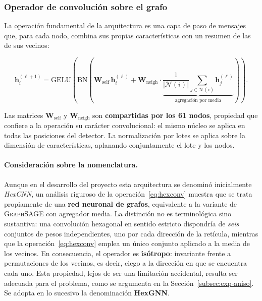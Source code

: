 \subsubsection{Operador de convolución sobre el grafo}

La operación fundamental de la arquitectura es una capa de paso de mensajes que, para cada nodo,
combina sus propias características con un resumen de las de sus vecinos:

\begin{equation}
    \mathbf{h}_i^{(\ell+1)} = \mathrm{GELU}\!\left(
        \mathrm{BN}\!\left(
            \mathbf{W}_{\text{self}}\, \mathbf{h}_i^{(\ell)}
            + \mathbf{W}_{\text{neigh}} \cdot
            \underbrace{\frac{1}{|\mathcal{N}(i)|} \sum_{j \in \mathcal{N}(i)} \mathbf{h}_j^{(\ell)}}_{\text{agregación por media}}
        \right)
    \right).
    \label{eq:hexconv}
\end{equation}

Las matrices $\mathbf{W}_{\text{self}}$ y $\mathbf{W}_{\text{neigh}}$ son \textbf{compartidas por
los 61 nodos}, propiedad que confiere a la operación su carácter convolucional: el mismo núcleo se
aplica en todas las posiciones del detector. La normalización por lotes se aplica sobre la dimensión
de características, aplanando conjuntamente el lote y los nodos.

\paragraph{Consideración sobre la nomenclatura.} Aunque en el desarrollo del proyecto esta
arquitectura se denominó inicialmente \emph{HexCNN}, un análisis riguroso de la
operación~\eqref{eq:hexconv} muestra que se trata propiamente de una \textbf{red neuronal de
grafos}, equivalente a la variante de \textsc{GraphSAGE} con agregador media. La distinción no es
terminológica sino sustantiva: una convolución hexagonal en sentido estricto dispondría de
\emph{seis} conjuntos de pesos independientes, uno por cada dirección de la retícula, mientras que la
operación~\eqref{eq:hexconv} emplea un único conjunto aplicado a la media de los vecinos. En
consecuencia, el operador es \textbf{isótropo}: invariante frente a permutaciones de los vecinos, es
decir, ciego a la dirección en que se encuentra cada uno. Esta propiedad, lejos de ser una
limitación accidental, resulta ser adecuada para el problema, como se argumenta en la
Sección~\ref{subsec:exp-aniso}. Se adopta en lo sucesivo la denominación \textbf{HexGNN}.

